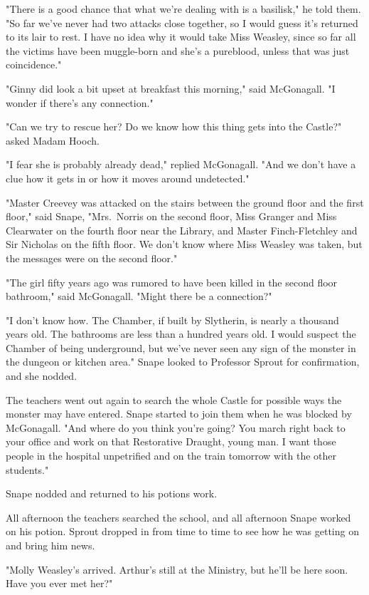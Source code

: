 "There is a good chance that what we're dealing with is a basilisk," he told them. "So far we've never had two attacks close together, so I would guess it's returned to its lair to rest. I have no idea why it would take Miss Weasley, since so far all the victims have been muggle-born and she's a pureblood, unless that was just coincidence."

"Ginny did look a bit upset at breakfast this morning," said McGonagall. "I wonder if there's any connection."

"Can we try to rescue her? Do we know how this thing gets into the Castle?" asked Madam Hooch.

"I fear she is probably already dead," replied McGonagall. "And we don't have a clue how it gets in or how it moves around undetected."

"Master Creevey was attacked on the stairs between the ground floor and the first floor," said Snape, "Mrs.~Norris on the second floor, Miss Granger and Miss Clearwater on the fourth floor near the Library, and Master Finch-Fletchley and Sir Nicholas on the fifth floor. We don't know where Miss Weasley was taken, but the messages were on the second floor."

"The girl fifty years ago was rumored to have been killed in the second floor bathroom," said McGonagall. "Might there be a connection?"

"I don't know how. The Chamber, if built by Slytherin, is nearly a thousand years old. The bathrooms are less than a hundred years old. I would suspect the Chamber of being underground, but we've never seen any sign of the monster in the dungeon or kitchen area." Snape looked to Professor Sprout for confirmation, and she nodded.

The teachers went out again to search the whole Castle for possible ways the monster may have entered. Snape started to join them when he was blocked by McGonagall. "And where do you think you're going? You march right back to your office and work on that Restorative Draught, young man. I want those people in the hospital unpetrified and on the train tomorrow with the other students."

Snape nodded and returned to his potions work.

All afternoon the teachers searched the school, and all afternoon Snape worked on his potion. Sprout dropped in from time to time to see how he was getting on and bring him news.

"Molly Weasley's arrived. Arthur's still at the Ministry, but he'll be here soon. Have you ever met her?"

